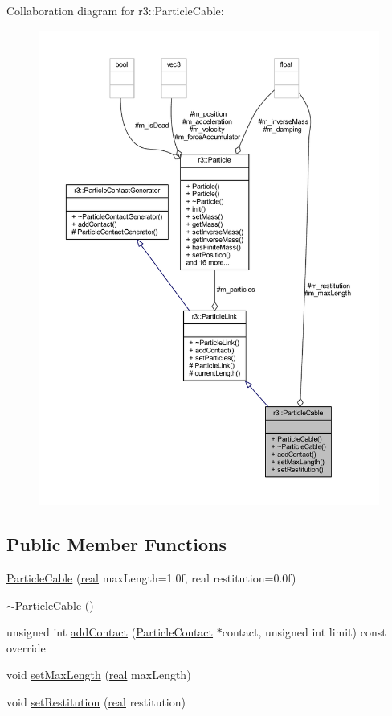 Collaboration diagram for r3\+:\+:Particle\+Cable\+:\nopagebreak
\begin{figure}[H]
\begin{center}
\leavevmode
\includegraphics[width=350pt]{classr3_1_1_particle_cable__coll__graph}
\end{center}
\end{figure}
\subsection*{Public Member Functions}
\begin{DoxyCompactItemize}
\item 
\mbox{\hyperlink{classr3_1_1_particle_cable_afcb568750f7430ec94e34942f766e087}{Particle\+Cable}} (\mbox{\hyperlink{namespacer3_ab2016b3e3f743fb735afce242f0dc1eb}{real}} max\+Length=1.\+0f, real restitution=0.\+0f)
\item 
\mbox{\hyperlink{classr3_1_1_particle_cable_a4ba107749641635a5d7b670eab78c371}{$\sim$\+Particle\+Cable}} ()
\item 
unsigned int \mbox{\hyperlink{classr3_1_1_particle_cable_af8024236316ae2cf7bd68a0e906ed7c7}{add\+Contact}} (\mbox{\hyperlink{classr3_1_1_particle_contact}{Particle\+Contact}} $\ast$contact, unsigned int limit) const override
\item 
void \mbox{\hyperlink{classr3_1_1_particle_cable_a6cf3d6cff00fa5a7eeb1df8975cd59de}{set\+Max\+Length}} (\mbox{\hyperlink{namespacer3_ab2016b3e3f743fb735afce242f0dc1eb}{real}} max\+Length)
\item 
void \mbox{\hyperlink{classr3_1_1_particle_cable_a070f8df68fbf2b7a7b758f1c5b22c42c}{set\+Restitution}} (\mbox{\hyperlink{namespacer3_ab2016b3e3f743fb735afce242f0dc1eb}{real}} restitution)
\end{DoxyCompactItemize}
